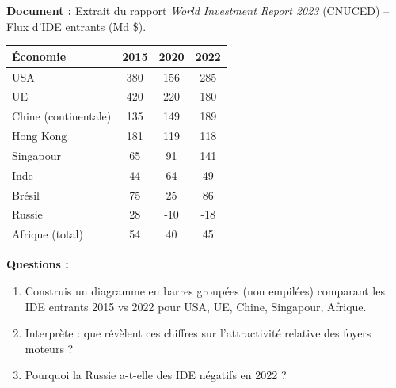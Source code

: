 \documentclass[11pt]{article}
\begin{document}
\begin{exoresolu}
\textbf{Document :} Extrait du rapport \emph{World Investment Report 2023} (CNUCED) -- Flux d'IDE entrants (Md \$).
\begin{center}
\begin{tabular}{|l|c|c|c|}\hline
\textbf{Économie} & \textbf{2015} & \textbf{2020} & \textbf{2022} \\ \hline
USA & 380 & 156 & 285 \\ \hline
UE & 420 & 220 & 180 \\ \hline
Chine (continentale) & 135 & 149 & 189 \\ \hline
Hong Kong & 181 & 119 & 118 \\ \hline
Singapour & 65 & 91 & 141 \\ \hline
Inde & 44 & 64 & 49 \\ \hline
Brésil & 75 & 25 & 86 \\ \hline
Russie & 28 & -10 & -18 \\ \hline
Afrique (total) & 54 & 40 & 45 \\ \hline
\end{tabular}
\end{center}
\textbf{Questions :}
\begin{enumerate}
    \item Construis un diagramme en barres groupées (non empilées) comparant les IDE entrants 2015 vs 2022 pour USA, UE, Chine, Singapour, Afrique.
    \item Interprète : que révèlent ces chiffres sur l'attractivité relative des foyers moteurs ?
    \item Pourquoi la Russie a-t-elle des IDE négatifs en 2022 ?
\end{enumerate}


\end{exoresolu}
\end{document}
